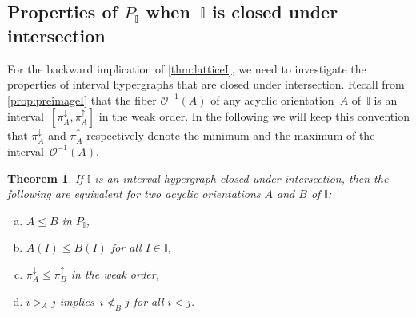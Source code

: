 \documentclass[reqno]{amsart}
\newtheorem{theorem}{Theorem}[section]
\theoremstyle{definition}
\newcommand{\less}{\vartriangleleft} %
\newcommand{\more}{\vartriangleright} %
\newcommand{\projDown}{\pi^\downarrow} %
\newcommand{\projUp}{\pi^\uparrow} %
\newcommand{\Or}{\mathcal O}  %
\newcommand{\II}{\mathbb I} %
\begin{document}

\subsection{Properties of $P_\II$ when~$\II$ is closed under intersection}  
\label{subsec:IntClosedI}

For the backward implication of \cref{thm:latticeI}, we need to investigate the properties of interval hypergraphs that are closed under intersection.
Recall from \cref{prop:preimageI} that the fiber $\Or^{-1}(A)$ of any acyclic orientation~$A$ of~$\II$ is an interval~$[\projDown_A,\projUp_A]$ in the weak order.
In the following we will keep this convention that $\projDown_A$ and $\projUp_A$ respectively denote the minimum and the maximum of the interval~$\Or^{-1}(A)$.

\begin{theorem}
\label{thm:propertiesI}
If $\II$ is an interval  hypergraph closed under intersection, then the following are equivalent for two acyclic orientations $A$ and $B$ of $\II$:
\begin{enumerate}[(a)]
	\item $A\le B$ in $P_\II$,
	\item $A(I) \le B(I)$ for all $I\in\II$,
	\item $\projDown_A \le \projUp_B$ in the weak order,
	\item $i \more_A j$ implies~$i \not\less_B j$ for all $i<j$.
\end{enumerate}
\end{theorem}
\end{document}
